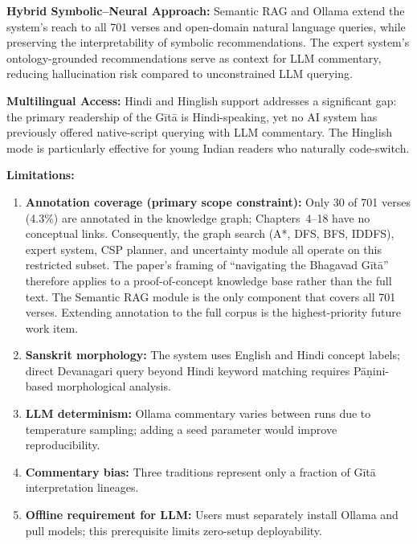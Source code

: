 \documentclass[conference]{IEEEtran}
\begin{document}
\textbf{Hybrid Symbolic--Neural Approach:} Semantic RAG and Ollama extend the
system's reach to all 701 verses and open-domain natural language queries, while
preserving the interpretability of symbolic recommendations. The expert system's
ontology-grounded recommendations serve as context for LLM commentary, reducing
hallucination risk compared to unconstrained LLM querying.

\textbf{Multilingual Access:} Hindi and Hinglish support addresses a significant
gap: the primary readership of the G\={i}t\={a} is Hindi-speaking, yet no AI system
has previously offered native-script querying with LLM commentary. The Hinglish
mode is particularly effective for young Indian readers who naturally code-switch.

\textbf{Limitations:}
\begin{enumerate}[leftmargin=*]
  \item \textbf{Annotation coverage (primary scope constraint):} Only 30 of 701
        verses (4.3\%) are annotated in the knowledge graph; Chapters~4--18 have
        no conceptual links. Consequently, the graph search (A*, DFS, BFS, IDDFS),
        expert system, CSP planner, and uncertainty module all operate on this
        restricted subset. The paper's framing of ``navigating the Bhagavad
        G\={i}t\={a}'' therefore applies to a proof-of-concept knowledge base rather
        than the full text. The Semantic RAG module is the only component that covers
        all 701 verses. Extending annotation to the full corpus is the highest-priority
        future work item.
  \item \textbf{Sanskrit morphology:} The system uses English and Hindi concept labels;
        direct Devanagari query beyond Hindi keyword matching requires P\={a}{\d{n}}ini-based
        morphological analysis.
  \item \textbf{LLM determinism:} Ollama commentary varies between runs due to
        temperature sampling; adding a seed parameter would improve reproducibility.
  \item \textbf{Commentary bias:} Three traditions represent only a fraction of
        G\={i}t\={a} interpretation lineages.
  \item \textbf{Offline requirement for LLM:} Users must separately install Ollama
        and pull models; this prerequisite limits zero-setup deployability.
\end{enumerate}

\clearpage
\end{document}
